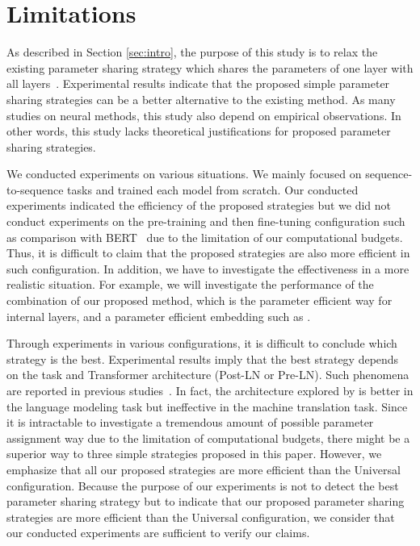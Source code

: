 \documentclass[11pt]{article}
\begin{document}
\section*{Limitations}
As described in Section \ref{sec:intro}, the purpose of this study is to relax the existing parameter sharing strategy which shares the parameters of one layer with all layers~\cite{dehghani2019,Dabre_Fujita_2019,lan2020}.
Experimental results indicate that the proposed simple parameter sharing strategies can be a better alternative to the existing method.
As many studies on neural methods, this study also depend on empirical observations.
In other words, this study lacks theoretical justifications for proposed parameter sharing strategies.

We conducted experiments on various situations.
We mainly focused on sequence-to-sequence tasks and trained each model from scratch.
Our conducted experiments indicated the efficiency of the proposed strategies but we did not conduct experiments on the pre-training and then fine-tuning configuration such as comparison with BERT~\cite{devlin-etal-2019-bert} due to the limitation of our computational budgets.
Thus, it is difficult to claim that the proposed strategies are also more efficient in such configuration.
In addition, we have to investigate the effectiveness in a more realistic situation.
For example, we will investigate the performance of the combination of our proposed method, which is the parameter efficient way for internal layers, and a parameter efficient embedding such as .


Through experiments in various configurations, it is difficult to conclude which strategy is the best.
Experimental results imply that the best strategy depends on the task and Transformer architecture (Post-LN or Pre-LN).
Such phenomena are reported in previous studies~\cite{press-etal-2020-improving,gulati2020conformer}.
In fact, the architecture explored by  is better in the language modeling task but ineffective in the machine translation task.
Since it is intractable to investigate a tremendous amount of possible parameter assignment way due to the limitation of computational budgets, there might be a superior way to three simple strategies proposed in this paper.
However, we emphasize that all our proposed strategies are more efficient than the Universal configuration.
Because the purpose of our experiments is not to detect the best parameter sharing strategy but to indicate that our proposed parameter sharing strategies are more efficient than the Universal configuration, we consider that our conducted experiments are sufficient to verify our claims.
\end{document}
